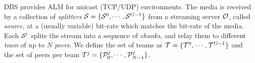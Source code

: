 DBS provides ALM for unicast (TCP/UDP) environments. The media is
received by a collection of
\emph{splitters} ${\cal S}=\{{\cal S}^0, \cdots, {\cal
  S}^{G-1}\}$ from a streaming server ${\cal O}$,
called \emph{source}, at a (usually variable) bit-rate which matches
the bit-rate of the media. Each ${\cal S}^i$ splits the
stream into a sequence of \emph{chunks}, and relay them to
different \emph{team} of up to $N$ \emph{peers}. We define the set of
teams as ${\cal T}=\{{\cal T}^0,\cdots,{\cal T}^{G-1}\}$ and the set
of peers per team $T^j=\{{\cal P}^j_0,\cdots,{\cal P}^j_{N-1}\}$.


